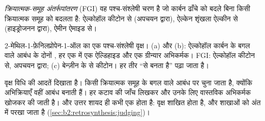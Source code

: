 \begin{definition}[क्रियात्मक-समूह अंतर्रूपांतरण]\label{def:b2:retrosynthesis:fgi}
\emph{क्रियात्मक-समूह अंतर्रूपांतरण} (FGI) वह
पश्च-संश्लेषी चरण है जो कार्बन ढाँचे को बदले बिना किसी क्रियात्मक समूह को बदलता है: ऐल्कोहॉल
कीटोन से (अपचयन द्वारा), ऐल्केन शृंखला ऐल्कीन से (हाइड्रोजनन द्वारा), ऐमीन ऐमाइड से।
\end{definition}

\begin{omfigure}
\par\vspace{6pt}

{\small 2-मेथिल-1-फ़ेनिलप्रोपेन-1-ऑल का एक पश्च-संश्लेषी वृक्ष। (a) और (b): ऐल्कोहॉल कार्बन के बगल वाले
 आबंध के दोनों , हर एक में एक ऐल्डिहाइड और एक ग्रीन्यार अभिकर्मक। FGI: ऐल्कोहॉल
कीटोन से, अपचयन द्वारा; (c) बेन्ज़ीन के  से कीटोन। हर तीर
``से बनता है'' पढ़ा जाता है।}
\end{omfigure}

वृक्ष विधि की आदतें दिखाता है।  किसी क्रियात्मक समूह के बगल वाले आबंध पर चुना जाता है,
क्योंकि अभिक्रियाएँ वहीं आबंध बनाती हैं। हर कटाव की जाँच  लिखकर और उनके लिए
वास्तविक अभिकर्मक खोजकर की जाती है। और उत्तर शायद ही कभी एक होता है: वृक्ष शाखित होता है, और शाखाओं को
अंत में परखा जाता है (\cref{sec:b2:retrosynthesis:judging})।


